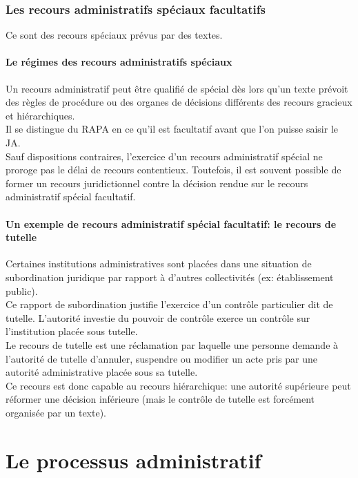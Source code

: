 \documentclass[10pt, a4paper, openany]{book}
\begin{document}
\subsection{Les recours administratifs spéciaux facultatifs}

Ce sont des recours spéciaux prévus par des textes. 

\subsubsection{Le régimes des recours administratifs spéciaux}

Un recours administratif peut être qualifié de spécial dès lors qu'un texte prévoit des règles de procédure ou des organes de décisions différents des recours gracieux et hiérarchiques. \\
Il se distingue du RAPA en ce qu'il est facultatif avant que l'on puisse saisir le JA. \\
Sauf dispositions contraires, l'exercice d'un recours administratif spécial ne proroge pas le délai de recours contentieux. Toutefois, il est souvent possible de former un recours juridictionnel contre la décision rendue sur le recours administratif spécial facultatif. 

\subsubsection{Un exemple de recours administratif spécial facultatif: le recours de tutelle}

Certaines institutions administratives sont placées dans une situation de subordination juridique par rapport à d'autres collectivités (ex: établissement public). \\
Ce rapport de subordination justifie l'exercice d'un contrôle particulier dit de tutelle. L'autorité investie du pouvoir de contrôle exerce un contrôle sur l'institution placée sous tutelle. \\
Le recours de tutelle est une réclamation par laquelle une personne demande à l'autorité de tutelle d'annuler, suspendre ou modifier un acte pris par une autorité administrative placée sous sa tutelle. \\
Ce recours est donc capable au recours hiérarchique: une autorité supérieure peut réformer une décision inférieure (mais le contrôle de tutelle est forcément organisée par un texte). 

\chapter{Le processus administratif}
\end{document}

